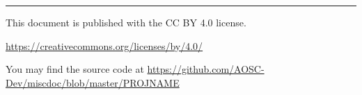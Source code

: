 

\vspace{20mm}
\vfill

\begin{minipage}{\linewidth}
    \sffamily
    \color{black!80}\raggedright\fontsize{10pt}{10pt}\selectfont
    \hrule
    \vspace{10pt}

    This document is published with the CC BY 4.0 license.
    
    \href{https://creativecommons.org/licenses/by/4.0/}{https://creativecommons.org/licenses/by/4.0/}

    You may find the source code at \href{https://github.com/AOSC-Dev/miscdoc/blob/master/PROJNAME}{https://github.com/AOSC-Dev/miscdoc/blob/master/PROJNAME}

\end{minipage}
